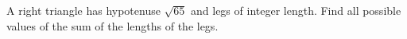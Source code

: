 A right triangle has hypotenuse $\sqrt{65}$ and legs of integer length. Find all possible values of the sum of the lengths of the legs.
